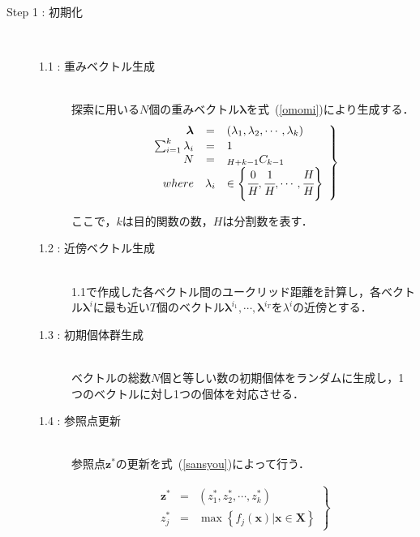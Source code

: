 \documentclass[11pt,a4j,notitlepage]{jreport}
\newcommand{\Eqref}[1]{式~(\ref{#1})}
\begin{document}
\begin{description}
\item[Step 1 : 初期化]\mbox{}\\
\vspace{-0.5in}
	\begin{description}
	\item[1.1 : 重みベクトル生成]\mbox{}\\
	探索に用いる$N$個の重みベクトル${\bm \lambda}$を\Eqref{omomi}により生成する．
	\begin{eqnarray}
	\left.
	\begin{array}{rcl}
	{\bm \lambda} & = & (\lambda_1, \lambda_2, \cdots, \lambda_k)\\
	\sum_{i=1}^{k} \lambda_i & = & 1\\
	N & = & {}_{H+k-1}C_{k-1}\\
	where & \lambda_i & \in \left\{ \cfrac{0}{H}, \cfrac{1}{H}, \cdots, \cfrac{H}{H} \right\}
	\end{array}
	\right\}
	\label{omomi}
	\end{eqnarray}

	ここで，$k$は目的関数の数，$H$は分割数を表す．


	\item[1.2 : 近傍ベクトル生成]\mbox{}\\
	1.1で作成した各ベクトル間のユークリッド距離を計算し，各ベクトル$\bm \lambda^i$に最も近い$T$個のベクトル$\bm \lambda^{i_1}, \cdots, \bm \lambda^{i_T}$を$\lambda^i$の近傍とする．

	\item[1.3 : 初期個体群生成]\mbox{}\\
	ベクトルの総数$N$個と等しい数の初期個体をランダムに生成し，1つのベクトルに対し1つの個体を対応させる．

	\item[1.4 : 参照点更新]\mbox{}\\
	参照点$\bm z^*$の更新を\Eqref{sansyou}によって行う．

	\begin{eqnarray}
	\left.
	\begin{array}{rcl}
	{\bm z^*} & = & (z_1^*, z_2^*, \cdots, z_k^*)\\
	z^*_j & = & \max \left\{ f_j (\bm x) | \bm x \in \bm X \right\}
	\end{array}
	\right\}
	\label{sansyou}
	\end{eqnarray}


\end{description}
\end{description}
\end{document}
